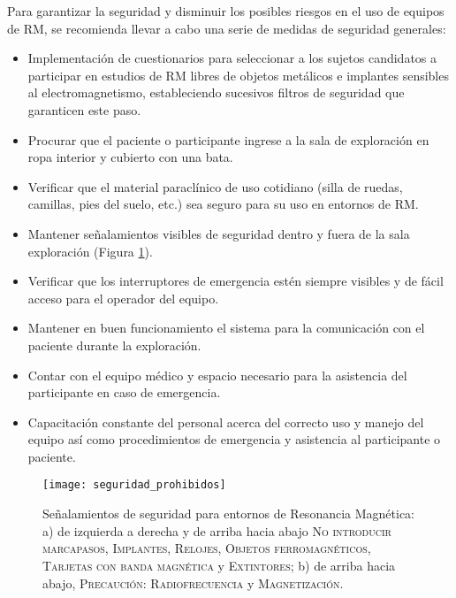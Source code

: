 Para garantizar la seguridad y disminuir los posibles riesgos en el uso de equipos de RM, se recomienda llevar a cabo una serie de medidas de seguridad generales:
\begin{itemize}
 \item Implementación de cuestionarios para seleccionar a los sujetos candidatos a participar en estudios de RM libres de objetos metálicos e implantes sensibles al electromagnetismo, estableciendo sucesivos filtros de seguridad que garanticen este paso.
 \item Procurar que el paciente o participante ingrese a la sala de exploración en ropa interior y cubierto con una bata. 
 \item Verificar que el material paraclínico de uso cotidiano (silla de ruedas, camillas, pies del suelo, etc.) sea seguro para su uso en entornos de RM.
 \item Mantener señalamientos visibles de seguridad dentro y fuera de la sala exploración (Figura \ref{fig:seguridad_prohibidos}).
 \item Verificar que los interruptores de emergencia estén siempre visibles y de fácil acceso para el operador del equipo.
 \item Mantener en buen funcionamiento el sistema para la comunicación con el paciente durante la exploración.
 \item  Contar con el equipo médico y espacio necesario para la asistencia del participante en caso de emergencia.
\item  Capacitación constante del personal acerca del correcto uso y manejo del equipo así como procedimientos de emergencia y asistencia al participante o paciente. 
\end{itemize}



\begin{figure}[htb]
\begin{figg}
   \texttt{[image: seguridad\_prohibidos]}
   \caption{Señalamientos de seguridad para entornos de Resonancia Magnética: a) de izquierda a derecha y de arriba hacia abajo \textsc{No introducir marcapasos}, \textsc{Implantes}, \textsc{Relojes}, \textsc{Objetos ferromagnéticos}, \textsc{Tarjetas con banda magnética} y \textsc{Extintores}; b) de arriba hacia abajo, \textsc{Precaución: Radiofrecuencia} y \textsc{Magnetización}.}
 \label{fig:seguridad_prohibidos}
 \end{figg}
\end{figure}


